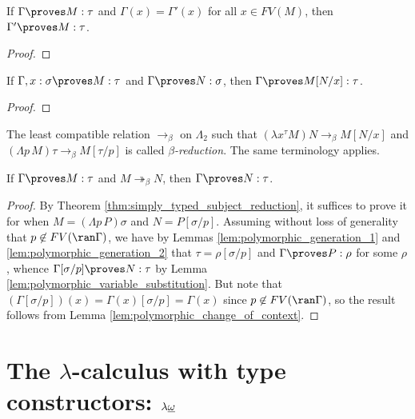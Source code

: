 \documentclass[reqno]{amsart}
\begin{document}
    \begin{lemma}\label{lem:polymorphic_change_of_context}
        If $\Gamma\proves M:\tau$ and $\Gamma(x)=\Gamma'(x)$ for all $x\in FV(M)$, then $\Gamma'\proves M:\tau$.
    \end{lemma}
    \begin{proof}
        \TODO
    \end{proof}

    \begin{lemma}\label{lem:polymorphic_substitution}
        If $\Gamma,x:\sigma\proves M:\tau$ and $\Gamma\proves N:\sigma$, then $\Gamma\proves M[N/x]:\tau$.
    \end{lemma}
    \begin{proof}
        \TODO
    \end{proof}

    \begin{definition}
        The least compatible relation $\rightarrow_\beta$ on $\Lambda_2$ such that $(\lambda x^\tau M)N\rightarrow_\beta M[N/x]$ and $(\Lambda p\,M)\tau\rightarrow_\beta M[\tau/p]$ is called \textit{$\beta$-reduction}. The same terminology applies.
    \end{definition}

    \begin{theorem}\label{thm:polymorphic_subject_reduction}
        If $\Gamma\proves M:\tau$ and $M\twoheadrightarrow_\beta N$, then $\Gamma\proves N:\tau$.
    \end{theorem}
    \begin{proof}
        By Theorem \ref{thm:simply_typed_subject_reduction}, it suffices to prove it for when $M=(\Lambda p\,P)\sigma$ and $N=P[\sigma/p]$. Assuming without loss of generality that $p\not\in FV(\ran\Gamma)$, we have by Lemmas \ref{lem:polymorphic_generation_1} and \ref{lem:polymorphic_generation_2} that $\tau=\rho[\sigma/p]$ and $\Gamma\proves P:\rho$ for some $\rho$, whence $\Gamma[\sigma/p]\proves N:\tau$ by Lemma \ref{lem:polymorphic_variable_substitution}. But note that $(\Gamma[\sigma/p])(x)=\Gamma(x)[\sigma/p]=\Gamma(x)$ since $p\not\in FV(\ran\Gamma)$, so the result follows from Lemma \ref{lem:polymorphic_change_of_context}. 
    \end{proof}

    \section{The $\lambda$-calculus with type constructors: $\lambda\uline{\omega}$}
\end{document}
